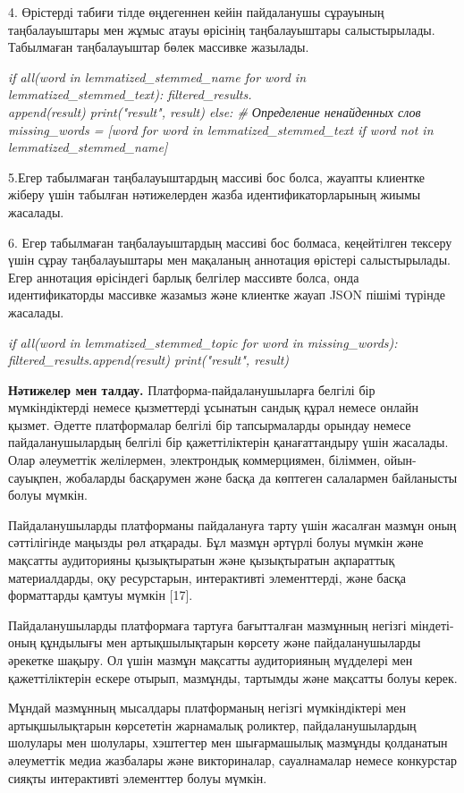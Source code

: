 \begin{multicols}{2}
4. Өрістерді табиғи тілде өңдегеннен кейін пайдаланушы сұрауының
таңбалауыштары мен жұмыс атауы өрісінің таңбалауыштары салыстырылады.
Табылмаған таңбалауыштар бөлек массивке жазылады.

\emph{if all(word in lemmatized\_stemmed\_name for word in
lemmatized\_stemmed\_text): filtered\_results.\\append(result)
print("result", result) else: \# Определение ненайденных слов
missing\_words = {[}word for word in lemmatized\_stemmed\_text if word
not in lemmatized\_stemmed\_name{]}}

5.Егер табылмаған таңбалауыштардың массиві бос болса, жауапты клиентке
жіберу үшін табылған нәтижелерден жазба идентификаторларының жиымы
жасалады.

6. Егер табылмаған таңбалауыштардың массиві бос болмаса, кеңейтілген
тексеру үшін сұрау таңбалауыштары мен мақаланың аннотация өрістері
салыстырылады. Егер аннотация өрісіндегі барлық белгілер массивте болса,
онда идентификаторды массивке жазамыз және клиентке жауап JSON пішімі
түрінде жасалады.

\emph{if all(word in lemmatized\_stemmed\_topic for word in
missing\_words): filtered\_results.append(result) print("result",
result)}

{\bfseries Нәтижелер мен талдау.} Платформа-пайдаланушыларға белгілі бір
мүмкіндіктерді немесе қызметтерді ұсынатын сандық құрал немесе онлайн
қызмет. Әдетте платформалар белгілі бір тапсырмаларды орындау немесе
пайдаланушылардың белгілі бір қажеттіліктерін қанағаттандыру үшін
жасалады. Олар әлеуметтік желілермен, электрондық коммерциямен,
біліммен, ойын-сауықпен, жобаларды басқарумен және басқа да көптеген
салалармен байланысты болуы мүмкін.

Пайдаланушыларды платформаны пайдалануға тарту үшін жасалған мазмұн оның
сәттілігінде маңызды рөл атқарады. Бұл мазмұн әртүрлі болуы мүмкін және
мақсатты аудиторияны қызықтыратын және қызықтыратын ақпараттық
материалдарды, оқу ресурстарын, интерактивті элементтерді, және басқа
форматтарды қамтуы мүмкін {[}17{]}.

Пайдаланушыларды платформаға тартуға бағытталған мазмұнның негізгі
міндеті-оның құндылығы мен артықшылықтарын көрсету және пайдаланушыларды
әрекетке шақыру. Ол үшін мазмұн мақсатты аудиторияның мүдделері мен
қажеттіліктерін ескере отырып, мазмұнды, тартымды және мақсатты болуы
керек.

Мұндай мазмұнның мысалдары платформаның негізгі мүмкіндіктері мен
артықшылықтарын көрсететін жарнамалық роликтер, пайдаланушылардың
шолулары мен шолулары, хэштегтер мен шығармашылық мазмұнды қолданатын
әлеуметтік медиа жазбалары және викториналар, сауалнамалар немесе
конкурстар сияқты интерактивті элементтер болуы мүмкін.


\end{multicols}
